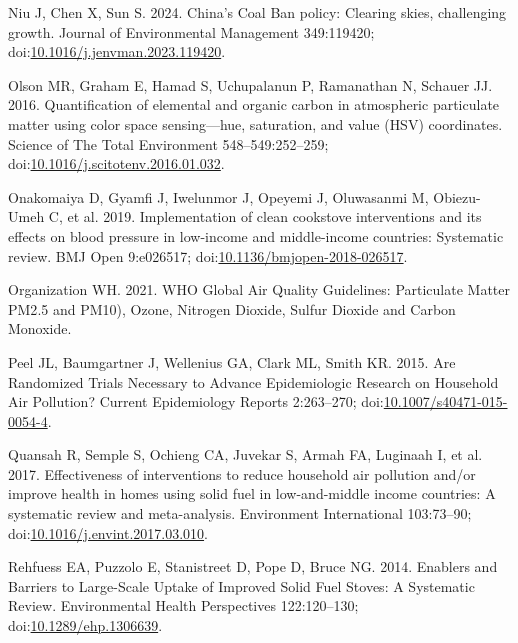 \documentclass[
  letterpaper,
  DIV=11,
  numbers=noendperiod]{scrartcl}
\newlength{\cslhangindent}
\newlength{\cslentryspacingunit} %
\newenvironment{CSLReferences}[2] %
 {%
  \setlength{\parindent}{0pt}
  \ifodd #1
  \let\oldpar\par
  \def\par{\hangindent=\cslhangindent\oldpar}
  \fi
  \setlength{\parskip}{#2\cslentryspacingunit}
 }%
 {}
\begin{document}
\begin{CSLReferences}{1}{0}
\leavevmode{}%
Niu J, Chen X, Sun S. 2024. China's {Coal Ban} policy: {Clearing} skies,
challenging growth. Journal of Environmental Management 349:119420;
doi:\href{https://doi.org/10.1016/j.jenvman.2023.119420}{10.1016/j.jenvman.2023.119420}.

\leavevmode{}%
Olson MR, Graham E, Hamad S, Uchupalanun P, Ramanathan N, Schauer JJ.
2016. Quantification of elemental and organic carbon in atmospheric
particulate matter using color space sensing---hue, saturation, and
value ({HSV}) coordinates. Science of The Total Environment
548--549:252--259;
doi:\href{https://doi.org/10.1016/j.scitotenv.2016.01.032}{10.1016/j.scitotenv.2016.01.032}.

\leavevmode{}%
Onakomaiya D, Gyamfi J, Iwelunmor J, Opeyemi J, Oluwasanmi M,
Obiezu-Umeh C, et al. 2019. Implementation of clean cookstove
interventions and its effects on blood pressure in low-income and
middle-income countries: Systematic review. BMJ Open 9:e026517;
doi:\href{https://doi.org/10.1136/bmjopen-2018-026517}{10.1136/bmjopen-2018-026517}.

\leavevmode{}%
Organization WH. 2021. {WHO Global Air Quality Guidelines}: {Particulate
Matter PM2}.5 and {PM10}), {Ozone}, {Nitrogen Dioxide}, {Sulfur Dioxide}
and {Carbon Monoxide}.

\leavevmode{}%
Peel JL, Baumgartner J, Wellenius GA, Clark ML, Smith KR. 2015. Are
{Randomized Trials Necessary} to {Advance Epidemiologic Research} on
{Household Air Pollution}? Current Epidemiology Reports 2:263--270;
doi:\href{https://doi.org/10.1007/s40471-015-0054-4}{10.1007/s40471-015-0054-4}.

\leavevmode{}%
Quansah R, Semple S, Ochieng CA, Juvekar S, Armah FA, Luginaah I, et al.
2017. Effectiveness of interventions to reduce household air pollution
and/or improve health in homes using solid fuel in low-and-middle income
countries: {A} systematic review and meta-analysis. Environment
International 103:73--90;
doi:\href{https://doi.org/10.1016/j.envint.2017.03.010}{10.1016/j.envint.2017.03.010}.

\leavevmode{}%
Rehfuess EA, Puzzolo E, Stanistreet D, Pope D, Bruce NG. 2014. Enablers
and {Barriers} to {Large-Scale Uptake} of {Improved Solid Fuel Stoves}:
{A Systematic Review}. Environmental Health Perspectives 122:120--130;
doi:\href{https://doi.org/10.1289/ehp.1306639}{10.1289/ehp.1306639}.


\end{CSLReferences}
\end{document}
